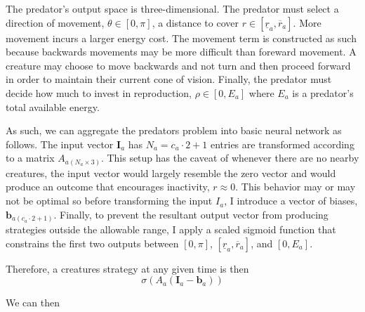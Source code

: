 \documentclass[12pt,english]{article}
\begin{document}
The predator's output space is three-dimensional. The predator must select a direction of movement, $\theta\in[0,\pi]$, a distance to cover $r\in[\underline{r}_a,\overline{r}_a]$. More movement incurs a larger energy cost. The movement term is constructed as such because backwards movements may be more difficult than foreward movement. A creature may choose to move backwards and not turn and then proceed forward in order to maintain their current cone of vision. Finally, the predator must decide how much to invest in reproduction, $\rho\in[0,E_a]$ where $E_a$ is a predator's total available energy.

As such, we can aggregate the predators problem into basic neural network as follows. The input vector $\mathbf{I}_a$ has $N_a=c_a\cdot2+1$ entries are transformed according to a matrix $A_{a(N_a\times 3)}$. This setup has the caveat of whenever there are no nearby creatures, the input vector would largely resemble the zero vector and would produce an outcome that encourages inactivity, $r\approx 0$. This behavior may or may not be optimal so before transforming the input $I_a$, I introduce a vector of biases, $\mathbf{b}_{a(c_a\cdot2+1)}$. Finally, to prevent the resultant output vector from producing strategies outside the allowable range, I apply a scaled sigmoid function that constrains the first two outputs between $[0,\pi]$, $[\underline{r}_a,\overline{r}_a]$, and $[0,E_a]$.

Therefore, a creatures strategy at any given time is then 
\[\sigma\left(A_a(\mathbf{I}_a-\mathbf{b}_a)\right)\]

We can then 
\end{document}
